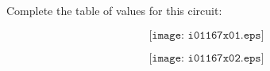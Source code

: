 

Complete the table of values for this circuit:

$$\texttt{[image: i01167x01.eps]}$$







$$\texttt{[image: i01167x02.eps]}$$










